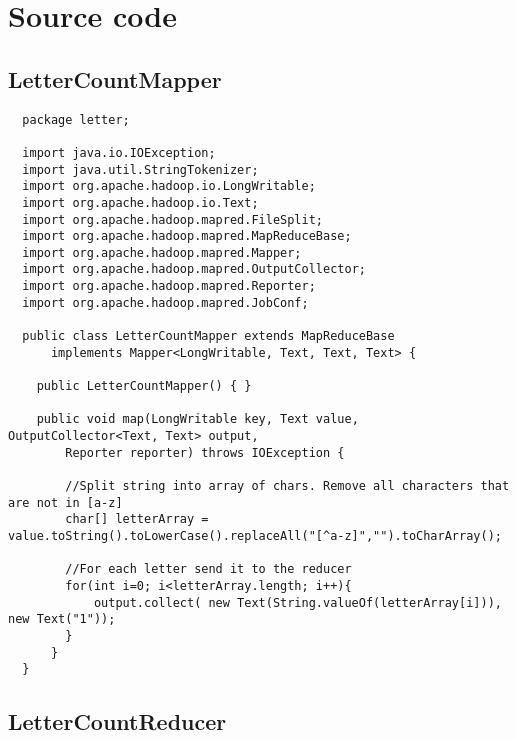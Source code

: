 \documentclass[10pt, a4paper]{article}
\begin{document}

\newpage
\section{Source code} %

\subsection{LetterCountMapper} %
\label{sub:lettercountmapper}
\begin{lstlisting}
  package letter;

  import java.io.IOException;
  import java.util.StringTokenizer;
  import org.apache.hadoop.io.LongWritable;
  import org.apache.hadoop.io.Text;
  import org.apache.hadoop.mapred.FileSplit;
  import org.apache.hadoop.mapred.MapReduceBase;
  import org.apache.hadoop.mapred.Mapper;
  import org.apache.hadoop.mapred.OutputCollector;
  import org.apache.hadoop.mapred.Reporter;
  import org.apache.hadoop.mapred.JobConf;

  public class LetterCountMapper extends MapReduceBase
      implements Mapper<LongWritable, Text, Text, Text> {

    public LetterCountMapper() { }

    public void map(LongWritable key, Text value, OutputCollector<Text, Text> output,
        Reporter reporter) throws IOException {

  	    //Split string into array of chars. Remove all characters that are not in [a-z]  
  	    char[] letterArray = value.toString().toLowerCase().replaceAll("[^a-z]","").toCharArray();

  	    //For each letter send it to the reducer
  	    for(int i=0; i<letterArray.length; i++){
  	    	output.collect( new Text(String.valueOf(letterArray[i])), new Text("1"));
  	    }
  	  }
  }
\end{lstlisting}


\newpage
\subsection{LetterCountReducer} %
\label{sub:lettercountreducer}
\end{document}

